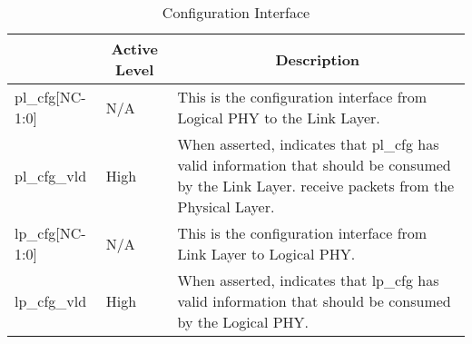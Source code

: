 \begin{table}[H]
    \caption{Configuration Interface}
    \centering
  \begin{tabular}{ |m{26mm}|m{10mm}|m{60mm}|  }
\hline
\rowcolor{Gray}
\multicolumn{1}{|c|}{\textbf{Name} } 
& \multicolumn{1}{|c|}{\textbf{Active Level}} 
& \multicolumn{1}{|c|}{\textbf{Description}}\\
\hline
pl\_cfg[NC-1:0] & N/A & This is the configuration interface from Logical PHY to the Link Layer. \\ \hline
pl\_cfg\_vld & High & When asserted, indicates that pl\_cfg has valid information that should be
consumed by the Link Layer.
receive packets from the Physical Layer. \\ \hline
lp\_cfg[NC-1:0] & N/A & This is the configuration interface from Link Layer to Logical PHY.\\ \hline
lp\_cfg\_vld & High &When asserted, indicates that lp\_cfg has valid information that should be
consumed by the Logical PHY. \\ \hline
\end{tabular}
\end{table}

